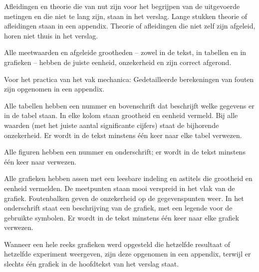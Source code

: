 \begin{checklist}
        Afleidingen en theorie die van nut zijn voor het begrijpen van de uitgevoerde metingen en die niet te lang zijn, staan in het verslag. Lange stukken theorie of afleidingen staan in een appendix. Theorie of afleidingen die niet zelf zijn afgeleid, horen niet thuis in het verslag.
    \item
        Alle meetwaarden en afgeleide grootheden – zowel in de tekst, in tabellen en in grafieken – hebben de juiste eenheid, onzekerheid en zijn correct afgerond. 
    \item
        Voor het practica van het vak mechanica: Gedetailleerde berekeningen van fouten zijn opgenomen in een appendix.
    \item
        Alle tabellen hebben een nummer en bovenschrift dat beschrijft welke gegevens er in de tabel staan. In elke kolom staan grootheid en eenheid vermeld. Bij alle waarden (met het juiste aantal significante cijfers) staat de bijhorende onzekerheid. Er wordt in de tekst minstens één keer naar elke tabel verwezen.
    \item
        Alle figuren hebben een nummer en onderschrift; er wordt in de tekst minstens één keer naar verwezen.
    \item
        Alle grafieken hebben assen met een leesbare indeling en astitels die grootheid en eenheid vermelden. De meetpunten staan mooi verspreid in het vlak van de grafiek. Foutenbalken geven de onzekerheid op de gegevenspunten weer. In het onderschrift staat een beschrijving van de grafiek, met een legende voor de gebruikte symbolen. Er wordt in de tekst minstens één keer naar elke grafiek verwezen.
    \item
        Wanneer een hele reeks grafieken werd opgesteld die hetzelfde resultaat of hetzelfde experiment weergeven, zijn deze opgenomen in een appendix, terwijl er slechts één grafiek in de hoofdtekst van het verslag staat.
\end{checklist}